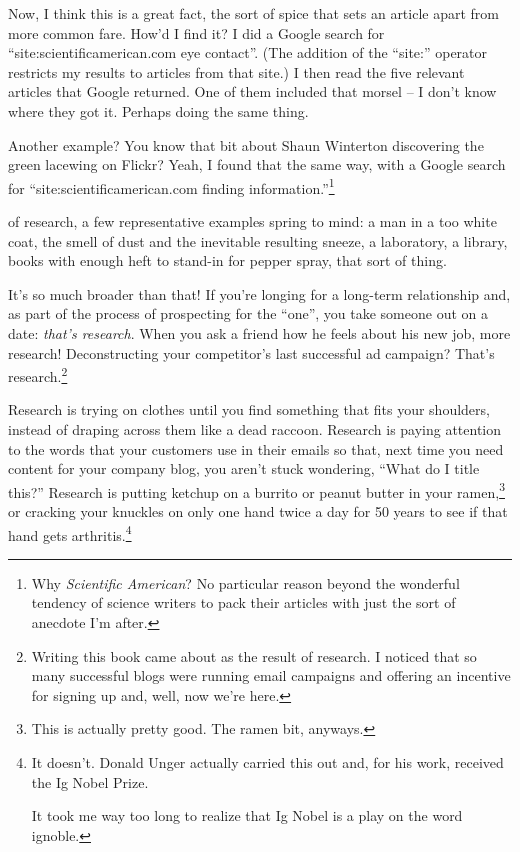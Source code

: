 Now, I think this is a great fact, the sort of spice that sets an article apart from more common fare. How'd I find it? I did a Google search for ``site:scientificamerican.com eye contact''. (The addition of the ``site:'' operator restricts my results to articles from that site.) I then read the five relevant articles that Google returned. One of them included that morsel -- I don't know where they got it. Perhaps doing the same thing.

Another example? You know that bit about Shaun Winterton discovering the green
lacewing on Flickr? Yeah, I found that the same way, with a Google search for
``site:scientificamerican.com finding information.''\footnote{Why
  \textit{Scientific American}? No particular reason beyond the wonderful
  tendency of science writers to pack their articles with just the sort of
  anecdote I'm after.}

 of research, a few representative examples spring
to mind: a man in a too white coat, the smell of dust and the inevitable resulting
sneeze, a laboratory, a library, books with enough heft to stand-in for pepper spray, that sort
of thing.

It's so much broader than that! If you're longing for a long-term relationship
and, as part of the process of prospecting for the ``one'', you take someone out on a date: \textit{that's
  research}. When you ask a friend how he feels about his new job, more
research! Deconstructing your competitor's last successful ad campaign? That's
research.\footnote{Writing this book came about as the result of research. I
  noticed that so many successful blogs were running email campaigns and
  offering an incentive for signing up and, well, now we're here.}

Research is trying on clothes until you find something that fits your shoulders,
instead of draping across them like a dead raccoon. Research is paying attention
to the words that your customers use in their emails so that, next time you need
content for your company blog, you aren't stuck wondering, ``What do I title
this?'' Research is putting ketchup on a burrito or peanut butter in your
ramen,\footnote{This is actually pretty good. The ramen bit, anyways.} or cracking your knuckles on only one
hand twice a day for 50 years to see if that hand gets arthritis.\footnote{It
  doesn't. Donald Unger actually carried this out and, for his work, received the
  Ig Nobel Prize.

  It took me way too long to realize that Ig Nobel is a play on the word ignoble.}


